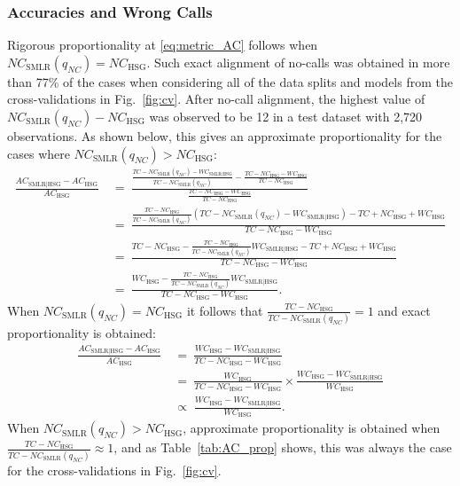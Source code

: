 \documentclass[preprint,5p,times,11pt]{elsarticle}
\begin{document}
\subsubsection*{Accuracies and Wrong Calls}
Rigorous proportionality at \eqref{eq:metric_AC} follows when $NC_{\text{SMLR}}(q_{NC}) = NC_{\text{HSG}}$.
Such exact alignment of no-calls was obtained in more than 77\% of the cases when considering all of the data splits and models from the cross-validations in Fig.~\ref{fig:cv}.
After no-call alignment, the highest value of $NC_{\text{SMLR}}(q_{NC}) - NC_{\text{HSG}}$ was observed to be 12 in a test dataset with 2,720 observations.
As shown below, this gives an approximate proportionality for the cases where $NC_{\text{SMLR}}(q_{NC}) > NC_{\text{HSG}}$:
\begin{align*}
\frac{AC_{\text{SMLR}\mid\text{HSG}} - AC_{\text{HSG}}}{AC_{\text{HSG}}}
\ &= \ 
\frac{\frac{TC - NC_{\text{SMLR}}(q_{NC}) - WC_{\text{SMLR}\mid\text{HSG}}}{TC - NC_{\text{SMLR}}(q_{NC})} - \frac{TC - NC_{\text{HSG}} - WC_{\text{HSG}}}{TC - NC_{\text{HSG}}}}{\frac{TC - NC_{\text{HSG}} - WC_{\text{HSG}}}{TC - NC_{\text{HSG}}}} \\
\ &= \ 
\frac{\frac{TC - NC_{\text{HSG}}}{TC - NC_{\text{SMLR}}(q_{NC})} \left(TC - NC_{\text{SMLR}}(q_{NC}) - WC_{\text{SMLR}\mid\text{HSG}}\right) - TC + NC_{\text{HSG}} + WC_{\text{HSG}}}{TC - NC_{\text{HSG}} - WC_{\text{HSG}}} \\
\ &= \ 
\frac{TC - NC_{\text{HSG}} - \frac{TC - NC_{\text{HSG}}}{TC - NC_{\text{SMLR}}(q_{NC})} WC_{\text{SMLR}\mid\text{HSG}} - TC + NC_{\text{HSG}} + WC_{\text{HSG}}}{TC - NC_{\text{HSG}} - WC_{\text{HSG}}} \\
\ &= \ 
\frac{WC_{\text{HSG}} - \frac{TC - NC_{\text{HSG}}}{TC - NC_{\text{SMLR}}(q_{NC})} WC_{\text{SMLR}\mid\text{HSG}}}{TC - NC_{\text{HSG}} - WC_{\text{HSG}}}.
\end{align*}
When $NC_{\text{SMLR}}(q_{NC}) = NC_{\text{HSG}}$ it follows that $\frac{TC - NC_{\text{HSG}}}{TC - NC_{\text{SMLR}}(q_{NC})} = 1$ and exact proportionality is obtained:
\begin{align*}
\frac{AC_{\text{SMLR}\mid\text{HSG}} - AC_{\text{HSG}}}{AC_{\text{HSG}}}
\ &= \ 
\frac{WC_{\text{HSG}} - WC_{\text{SMLR}\mid\text{HSG}}}{TC - NC_{\text{HSG}} - WC_{\text{HSG}}} \\
\ &= \ 
\frac{WC_{\text{HSG}}}{TC - NC_{\text{HSG}} - WC_{\text{HSG}}} \times \frac{WC_{\text{HSG}} - WC_{\text{SMLR}\mid\text{HSG}}}{WC_{\text{HSG}}} \\
\; &\propto \; 
\frac{WC_{\text{HSG}} - WC_{\text{SMLR}\mid\text{HSG}}}{WC_{\text{HSG}}}.
\end{align*}
When $NC_{\text{SMLR}}(q_{NC}) > NC_{\text{HSG}}$, approximate proportionality is obtained when $\frac{TC - NC_{\text{HSG}}}{TC - NC_{\text{SMLR}}(q_{NC})} \approx 1$, and as Table~\ref{tab:AC_prop} shows, this was always the case for the cross-validations in Fig.~\ref{fig:cv}.
\end{document}
